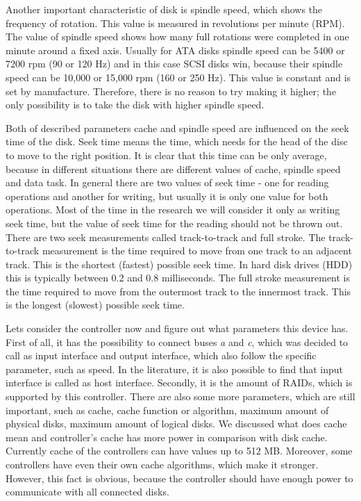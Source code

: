 Another important characteristic of disk is spindle speed, which shows the frequency of rotation. This value is measured in revolutions per minute (RPM). The value of spindle speed shows how many full rotations were completed in one minute around a fixed axis. Usually for ATA disks spindle speed can be 5400 or 7200 rpm (90 or 120 Hz) and in this case SCSI disks win, because their spindle speed can be 10,000 or 15,000 rpm (160 or 250 Hz). This value is constant and is set by manufacture. Therefore, there is no reason to try making it higher; the only possibility is to take the disk with higher spindle speed.

Both of described parameters cache and spindle speed are influenced on the seek time of the disk. Seek time means the time, which needs for the head of the disc to move to the right position. It is clear that this time can be only average, because in different situations there are different values of cache, spindle speed and data task. In general there are two values of seek time - one for reading operations and another for writing, but usually it is only one value for both operations. Most of the time in the research we will consider it only as writing seek time, but the value of seek time for the reading should not be thrown out. There are two seek measurements called track-to-track and full stroke. The track-to-track measurement is the time required to move from one track to an adjacent track. This is the shortest (fastest) possible seek time. In hard disk drives (HDD) this is typically between 0.2 and 0.8 milliseconds. The full stroke measurement is the time required to move from the outermost track to the innermost track. This is the longest (slowest) possible seek time.

Lets consider the controller now and figure out what parameters this device has. First of all, it has the possibility to connect buses \emph{a} and \emph{c}, which was decided to call as input interface and output interface, which also follow the specific parameter, such as speed. In the literature, it is also possible to find that input interface is called as host interface. Secondly, it is the amount of RAIDs, which is supported by this controller. There are also some more parameters, which are still important, such as cache, cache function or algorithm, maximum amount of physical disks, maximum amount of logical disks. We discussed what does cache mean and controller’s cache has more power in comparison with disk cache. Currently cache of the controllers can have values up to 512 MB. Moreover, some controllers have even their own cache algorithms, which make it stronger. However, this fact is obvious, because the controller should have enough power to communicate with all connected disks.

